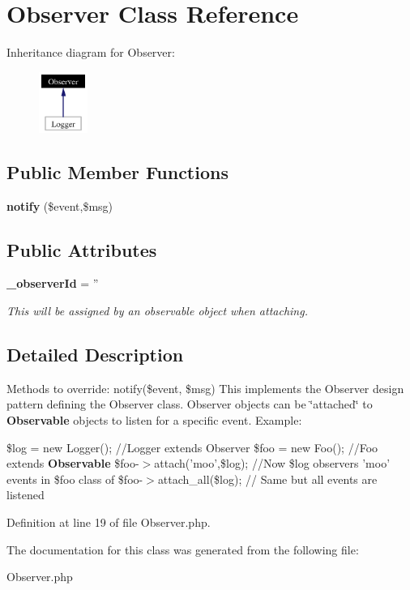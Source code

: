 \section{Observer Class Reference}
\label{classObserver}
Inheritance diagram for Observer:\begin{figure}[H]
\begin{center}
\leavevmode
\includegraphics[width=45pt]{classObserver__inherit__graph}
\end{center}
\end{figure}
\subsection*{Public Member Functions}
\begin{CompactItemize}
\item 
{}
{\bf notify} (\$event,\$msg)\label{classObserver_a0}

\end{CompactItemize}
\subsection*{Public Attributes}
\begin{CompactItemize}
\item 
{}
{\bf \_\-observer\-Id} = ''\label{classObserver_m0}

\begin{CompactList}\small\item\em This will be assigned by an observable object when attaching.\item\end{CompactList}\end{CompactItemize}


\subsection{Detailed Description}
Methods to override: notify(\$event, \$msg) This implements the Observer design pattern defining the Observer class. Observer objects can be \char`\"{}attached\char`\"{} to {\bf Observable} objects to listen for a specific event. Example:

\$log = new Logger(); //Logger extends Observer \$foo = new Foo(); //Foo extends {\bf Observable} \$foo-$>$attach('moo',\$log); //Now \$log observers 'moo' events in \$foo class of \$foo-$>$attach\_\-all(\$log); // Same but all events are listened 



Definition at line 19 of file Observer.php.

The documentation for this class was generated from the following file:\begin{CompactItemize}
\item 
Observer.php\end{CompactItemize}
